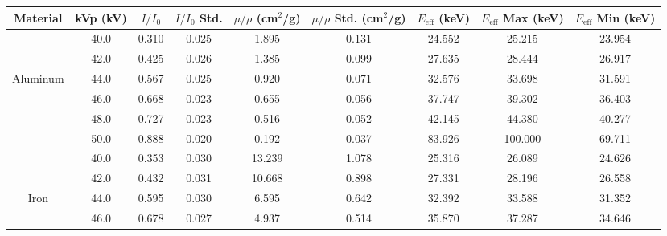 \begin{tabularx}{1.27\textwidth}{ccccccccc}

    \toprule
    Material & kVp (kV) &  $I/I_0$ &  $I/I_0$ Std. &  $\mu/\rho$ (cm$^2$/g) &  $\mu/\rho$ Std. (cm$^2$/g) &  $E_{\text{eff}}$ (keV) &  $E_{\text{eff}}$ Max (keV) &  $E_{\text{eff}}$ Min (keV) \\
    \midrule
    & 40.0 &    0.310 &         0.025 &                  1.895 &                       0.131 &                  24.552 &                      25.215 &                      23.954 \\
    & 42.0 &    0.425 &         0.026 &                  1.385 &                       0.099 &                  27.635 &                      28.444 &                      26.917 \\
    Aluminum& 44.0 &    0.567 &         0.025 &                  0.920 &                       0.071 &                  32.576 &                      33.698 &                      31.591 \\
    & 46.0 &    0.668 &         0.023 &                  0.655 &                       0.056 &                  37.747 &                      39.302 &                      36.403 \\
    & 48.0 &    0.727 &         0.023 &                  0.516 &                       0.052 &                  42.145 &                      44.380 &                      40.277 \\
    & 50.0 &    0.888 &         0.020 &                  0.192 &                       0.037 &                  83.926 &                     100.000 &                      69.711 \\
    \midrule
    & 40.0 &    0.353 &         0.030 &                 13.239 &                       1.078 &                  25.316 &                      26.089 &                      24.626 \\
    & 42.0 &    0.432 &         0.031 &                 10.668 &                       0.898 &                  27.331 &                      28.196 &                      26.558 \\
    Iron& 44.0 &    0.595 &         0.030 &                  6.595 &                       0.642 &                  32.392 &                      33.588 &                      31.352 \\
    & 46.0 &    0.678 &         0.027 &                  4.937 &                       0.514 &                  35.870 &                      37.287 &                      34.646 \\

\end{tabularx}
